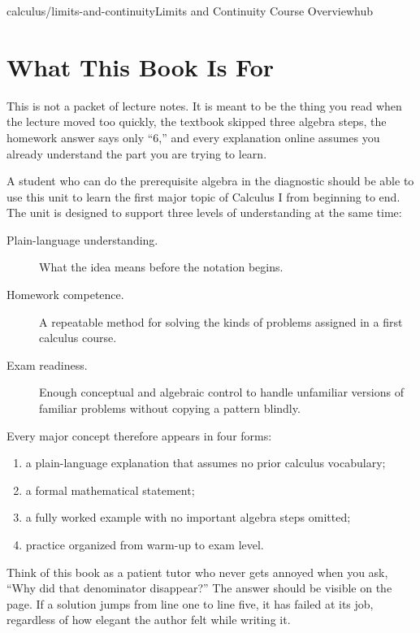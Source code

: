 \begin{webpage}{calculus/limits-and-continuity}{Limits and Continuity Course Overview}{hub}
\chapter*{What This Book Is For}

This is not a packet of lecture notes. It is meant to be the thing you read when the lecture moved too quickly, the textbook skipped three algebra steps, the homework answer says only ``6,'' and every explanation online assumes you already understand the part you are trying to learn.

A student who can do the prerequisite algebra in the diagnostic should be able to use this unit to learn the first major topic of Calculus I from beginning to end. The unit is designed to support three levels of understanding at the same time:

\begin{description}
  \item[Plain-language understanding.] What the idea means before the notation begins.
  \item[Homework competence.] A repeatable method for solving the kinds of problems assigned in a first calculus course.
  \item[Exam readiness.] Enough conceptual and algebraic control to handle unfamiliar versions of familiar problems without copying a pattern blindly.
\end{description}

Every major concept therefore appears in four forms:

\begin{enumerate}
  \item a plain-language explanation that assumes no prior calculus vocabulary;
  \item a formal mathematical statement;
  \item a fully worked example with no important algebra steps omitted;
  \item practice organized from warm-up to exam level.
\end{enumerate}

\begin{bgconcept}
Think of this book as a patient tutor who never gets annoyed when you ask, ``Why did that denominator disappear?'' The answer should be visible on the page. If a solution jumps from line one to line five, it has failed at its job, regardless of how elegant the author felt while writing it.
\end{bgconcept}


\end{webpage}

